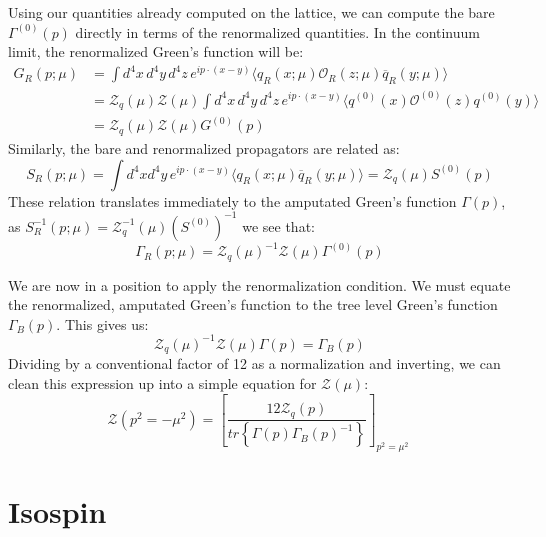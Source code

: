\documentclass[11pt, oneside]{article}   	%
\theoremstyle{definition}
\begin{document}
Using our quantities already computed on the lattice, we can compute the bare $\Gamma^{(0)}(p)$ directly in terms 
of the renormalized quantities. In the continuum limit, the renormalized Green's function will be:
\begin{align}
	G_R(p; \mu) &= \int d^4x \, d^4 y\, d^4 z\, e^{ip\cdot (x - y)} \langle q_R(x; \mu) \mathcal O_R(z; \mu) \overline 
	q_R(y; \mu) 
	\rangle \\
	&= \mathcal Z_q(\mu) \mathcal Z(\mu) \int d^4x \, d^4 y\, d^4 z\, e^{ip\cdot (x - y)} \langle q^{(0)}(x) \mathcal O^{(0)}
	(z) q^{(0)}(y) \rangle \\
	&= \mathcal Z_q(\mu) \mathcal Z(\mu) G^{(0)}(p)
\end{align}
Similarly, the bare and renormalized propagators are related as:
\begin{equation}
	S_R(p; \mu) = \int d^4x d^4 y\, e^{ip\cdot(x - y)}\langle q_R(x; \mu)\overline q_R(y; \mu)\rangle = \mathcal Z_q(\mu) 
	S^{(0)}(p)
\end{equation}
These relation translates immediately to the amputated Green's function $\Gamma(p)$, as $S^{-1}_R(p; \mu) = \mathcal 
Z_q^{-1}(\mu) (S^{(0)})^{-1}$ we see that:
\begin{equation}
	\Gamma_R(p; \mu) = \mathcal Z_q(\mu)^{-1}\mathcal Z(\mu) \Gamma^{(0)}(p)
\end{equation}

We are now in a position to apply the renormalization condition. We must equate the renormalized, amputated Green's function 
to the tree level Green's function $\Gamma_B(p)$. This gives us:
\begin{equation}
	\mathcal Z_q(\mu)^{-1}\mathcal Z(\mu) \Gamma(p) = \Gamma_B(p)
\end{equation}
Dividing by a conventional factor of 12 as a normalization and inverting, we can clean this expression up into a simple equation 
for $\mathcal Z(\mu)$:
\begin{equation}
	\mathcal Z(p^2 = -\mu^2) = \left[\frac{12\mathcal Z_q(p)}{tr\left\{\Gamma(p)\Gamma_B(p)^{-1}\right\}}\right]_{p^2 
	= \mu^2}~
	\label{eq:rc}
\end{equation}

\section{Isospin}
\end{document}
